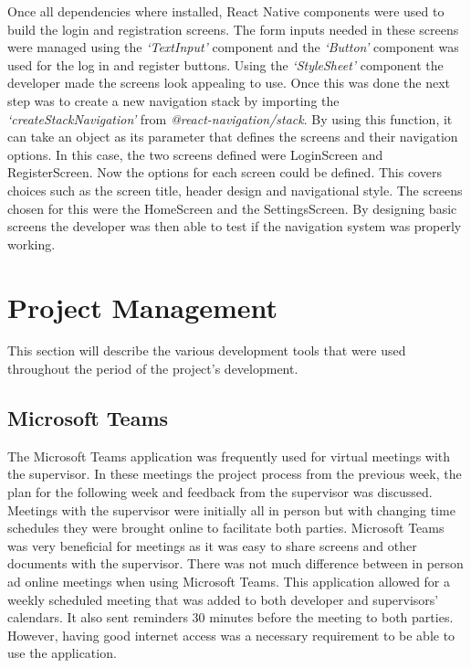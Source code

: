 Once all dependencies where installed, React Native components were used to build the login and registration screens. The form inputs needed in these screens were managed using the \emph{‘TextInput’} component and the \emph{‘Button’} component was used for the log in and register buttons. Using the \emph{‘StyleSheet’} component the developer made the screens look appealing to use. Once this was done the next step was to create a new navigation stack by importing the \emph{‘createStackNavigation’} from \emph{@react-navigation/stack}. By using this function, it can take an object as its parameter that defines the screens and their navigation options. In this case, the two screens defined were LoginScreen and RegisterScreen. 
\newline \newline
Now the options for each screen could be defined. This covers choices such as the screen title, header design and navigational style. The screens chosen for this were the HomeScreen and the SettingsScreen. By designing basic screens the developer was then able to test if the navigation system was properly working.







\section{Project Management}
 
This section will describe the various development tools that were used throughout the period of the project's development.

\subsection{Microsoft Teams}

The Microsoft Teams application was frequently used for virtual meetings with the supervisor. In these meetings the project process from the previous week, the plan for the following week and feedback from the supervisor was discussed. Meetings with the supervisor were initially all in person but with changing time schedules they were brought online to facilitate both parties. Microsoft Teams was very beneficial for meetings as it was easy to share screens and other documents with the supervisor. There was not much difference between in person ad online meetings when using Microsoft Teams. This application allowed for a weekly scheduled meeting that was added to both developer and supervisors’ calendars. It also sent reminders 30 minutes before the meeting to both parties. However, having good internet access was a necessary requirement to be able to use the application. 

